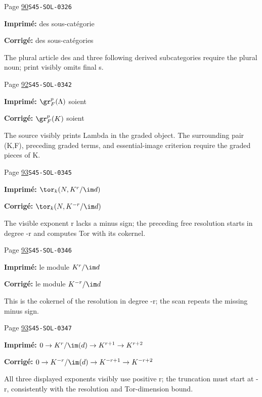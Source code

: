 \begin{description}
\smallskip
\item[\hypertarget{apparatus:FR-0039}{39}] Page \hyperlink{printpage:fr:90}{90}\quad\texttt{S45-SOL-0326}
\par\noindent\textbf{Imprimé:} des sous-catégorie
\par\noindent\textbf{Corrigé:} des sous-catégories
\par\noindent The plural article des and three following derived subcategories require the plural noun; print visibly omits final s.
\smallskip
\item[\hypertarget{apparatus:FR-0040}{40}] Page \hyperlink{printpage:fr:92}{92}\quad\texttt{S45-SOL-0342}
\par\noindent\textbf{Imprimé:} $\gr_F^p(\Lambda)$ soient
\par\noindent\textbf{Corrigé:} $\gr_F^p(K)$ soient
\par\noindent The source visibly prints Lambda in the graded object. The surrounding pair (K,F), preceding graded terms, and essential-image criterion require the graded pieces of K.
\smallskip
\item[\hypertarget{apparatus:FR-0041}{41}] Page \hyperlink{printpage:fr:93}{93}\quad\texttt{S45-SOL-0345}
\par\noindent\textbf{Imprimé:} \(\tor_k(N,K^r/\im d)\)
\par\noindent\textbf{Corrigé:} \(\tor_k(N,K^{-r}/\im d)\)
\par\noindent The visible exponent r lacks a minus sign; the preceding free resolution starts in degree -r and computes Tor with its cokernel.
\smallskip
\item[\hypertarget{apparatus:FR-0042}{42}] Page \hyperlink{printpage:fr:93}{93}\quad\texttt{S45-SOL-0346}
\par\noindent\textbf{Imprimé:} le module $K^r/\im d$
\par\noindent\textbf{Corrigé:} le module $K^{-r}/\im d$
\par\noindent This is the cokernel of the resolution in degree -r; the scan repeats the missing minus sign.
\smallskip
\item[\hypertarget{apparatus:FR-0043}{43}] Page \hyperlink{printpage:fr:93}{93}\quad\texttt{S45-SOL-0347}
\par\noindent\textbf{Imprimé:} \(0 \to K^r/\im(d) \to K^{r+1} \to K^{r+2}\)
\par\noindent\textbf{Corrigé:} \(0 \to K^{-r}/\im(d) \to K^{-r+1} \to K^{-r+2}\)
\par\noindent All three displayed exponents visibly use positive r; the truncation must start at -r, consistently with the resolution and Tor-dimension bound.

\end{description}
